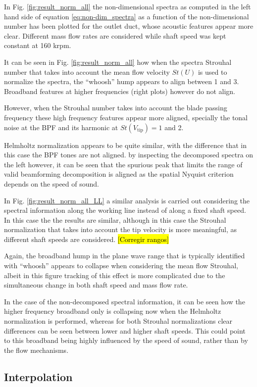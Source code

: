 In Fig. \ref{fig:result_norm_all} the non-dimensional spectra as computed in the left hand side of equation \ref{eq:non-dim_spectra} as a function of the non-dimensional number has been plotted for the outlet duct, whose acoustic features appear more clear. Different mass flow rates are considered while shaft speed was kept constant at 160 krpm. 

It can be seen in Fig. \ref{fig:result_norm_all} how when the spectra Strouhal number that takes into account the mean flow velocity $St(U)$ is used to normalize the spectra, the ``whoosh'' hump appears to align between 1 and 3. Broadband features at higher frequencies (right plots) however do not align.

However, when the Strouhal number takes into account the blade passing frequency these high frequency features appear more aligned, specially the tonal noise at the BPF and its harmonic at $St(V_\text{tip})=1$ and 2. 

Helmholtz normalization appears to be quite similar, with the difference that in this case the BPF tones are not aligned. by inspecting the decomposed spectra on the left however, it can be seen that the spurious peak that limits the range of valid beamforming decomposition is aligned as the spatial Nyquist criterion depends on the speed of sound.

In Fig. \ref{fig:result_norm_all_LL} a similar analysis is carried out considering the spectral information along the working line instead of along a fixed shaft speed. In this case the the results are similar, although in this case the Strouhal normalization that takes into account the tip velocity is more meaningful, as different shaft speeds are considered. \hl{[Corregir rangos]}

Again, the broadband hump in the plane wave range that is typically identified with ``whoosh'' appears to collapse when considering the mean flow Strouhal, albeit in this figure tracking of this effect is more complicated due to the simultaneous change in both shaft speed and mass flow rate. 

In the case of the non-decomposed spectral information, it can be seen how the higher frequency broadband only is collapsing now when the Helmholtz normalization is performed, whereas for both Strouhal normalizations clear differences can be seen between lower and higher shaft speeds. This could point to this broadband being highly influenced by the speed of sound, rather than by the flow mechanisms.

\subsection{Interpolation}

